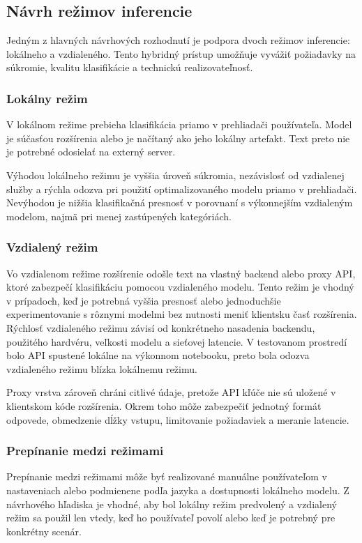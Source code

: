 \subsection{Návrh režimov inferencie}
Jedným z hlavných návrhových rozhodnutí je podpora dvoch režimov inferencie: lokálneho a vzdialeného. Tento hybridný prístup umožňuje vyvážiť požiadavky na súkromie, kvalitu klasifikácie a technickú realizovateľnosť.

\subsubsection{Lokálny režim}
V lokálnom režime prebieha klasifikácia priamo v prehliadači používateľa. Model je súčasťou rozšírenia alebo je načítaný ako jeho lokálny artefakt. Text preto nie je potrebné odosielať na externý server.

Výhodou lokálneho režimu je vyššia úroveň súkromia, nezávislosť od vzdialenej služby a rýchla odozva pri použití optimalizovaného modelu priamo v prehliadači. Nevýhodou je nižšia klasifikačná presnosť v porovnaní s výkonnejším vzdialeným modelom, najmä pri menej zastúpených kategóriách.

\subsubsection{Vzdialený režim}
Vo vzdialenom režime rozšírenie odošle text na vlastný backend alebo proxy API, ktoré zabezpečí klasifikáciu pomocou vzdialeného modelu. Tento režim je vhodný v prípadoch, keď je potrebná vyššia presnosť alebo jednoduchšie experimentovanie s rôznymi modelmi bez nutnosti meniť klientsku časť rozšírenia. Rýchlosť vzdialeného režimu závisí od konkrétneho nasadenia backendu, použitého hardvéru, veľkosti modelu a sieťovej latencie. V testovanom prostredí bolo API spustené lokálne na výkonnom notebooku, preto bola odozva vzdialeného režimu blízka lokálnemu režimu.

Proxy vrstva zároveň chráni citlivé údaje, pretože API kľúče nie sú uložené v klientskom kóde rozšírenia. Okrem toho môže zabezpečiť jednotný formát odpovede, obmedzenie dĺžky vstupu, limitovanie požiadaviek a meranie latencie.

\subsubsection{Prepínanie medzi režimami}
Prepínanie medzi režimami môže byť realizované manuálne používateľom v nastaveniach alebo podmienene podľa jazyka a dostupnosti lokálneho modelu. Z návrhového hľadiska je vhodné, aby bol lokálny režim predvolený a vzdialený režim sa použil len vtedy, keď ho používateľ povolí alebo keď je potrebný pre konkrétny scenár.

